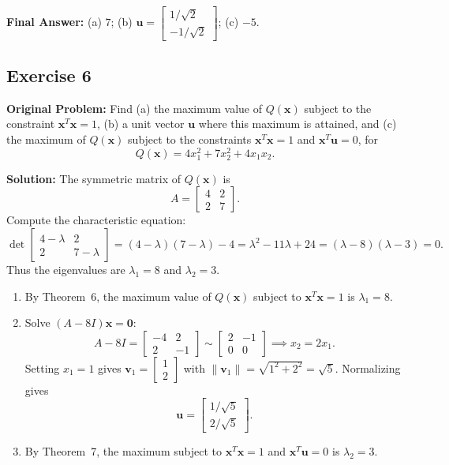 \documentclass[11pt, letterpaper]{article}
\theoremstyle{definition}
\theoremstyle{remark}
\begin{document}
\textbf{Final Answer:} (a) $7$; (b) $\mathbf{u} = \begin{bmatrix} 1/\sqrt{2} \\ -1/\sqrt{2} \end{bmatrix}$; (c) $-5$.

\subsection{Exercise 6}
\textbf{Original Problem:} Find (a) the maximum value of $Q(\mathbf{x})$ subject to the constraint $\mathbf{x}^T \mathbf{x} = 1$, (b) a unit vector $\mathbf{u}$ where this maximum is attained, and (c) the maximum of $Q(\mathbf{x})$ subject to the constraints $\mathbf{x}^T \mathbf{x} = 1$ and $\mathbf{x}^T \mathbf{u} = 0$, for
\[
Q(\mathbf{x}) = 4x_1^2 + 7x_2^2 + 4x_1x_2.
\]

\textbf{Solution:}
The symmetric matrix of $Q(\mathbf{x})$ is
\[
A = \begin{bmatrix} 4 & 2 \\ 2 & 7 \end{bmatrix}.
\]
Compute the characteristic equation:
\[
\det\begin{bmatrix} 4 - \lambda & 2 \\ 2 & 7 - \lambda \end{bmatrix} = (4 - \lambda)(7 - \lambda) - 4 = \lambda^2 - 11\lambda + 24 = (\lambda - 8)(\lambda - 3) = 0.
\]
Thus the eigenvalues are $\lambda_1 = 8$ and $\lambda_2 = 3$.
\begin{enumerate}[label=(\alph*)]
    \item By Theorem~6, the maximum value of $Q(\mathbf{x})$ subject to $\mathbf{x}^T \mathbf{x} = 1$ is $\lambda_1 = 8$.
    \item Solve $(A - 8I)\mathbf{x} = \mathbf{0}$:
    \[
    A - 8I = \begin{bmatrix} -4 & 2 \\ 2 & -1 \end{bmatrix} \sim \begin{bmatrix} 2 & -1 \\ 0 & 0 \end{bmatrix} \implies x_2 = 2x_1.
    \]
    Setting $x_1 = 1$ gives $\mathbf{v}_1 = \begin{bmatrix} 1 \\ 2 \end{bmatrix}$ with $\|\mathbf{v}_1\| = \sqrt{1^2 + 2^2} = \sqrt{5}$. Normalizing gives
    \[
    \mathbf{u} = \begin{bmatrix} 1/\sqrt{5} \\ 2/\sqrt{5} \end{bmatrix}.
    \]
    \item By Theorem~7, the maximum subject to $\mathbf{x}^T \mathbf{x} = 1$ and $\mathbf{x}^T \mathbf{u} = 0$ is $\lambda_2 = 3$.
\end{enumerate}
\end{document}
